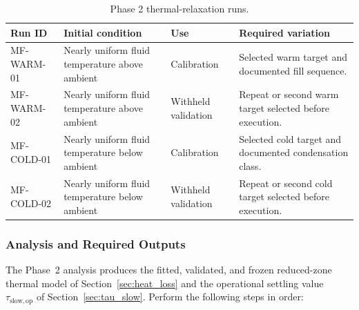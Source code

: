 \documentclass[11pt]{article}
\begin{document}
\begin{table}[htbp]
    \centering
    \caption{Phase 2 thermal-relaxation runs.}
    \label{tab:phase2_relaxation_runs}
    \begin{tabularx}{\textwidth}{
        @{}
        >{\raggedright\arraybackslash}p{1.25in}
        >{\raggedright\arraybackslash}p{1.75in}
        >{\raggedright\arraybackslash}p{1.35in}
        >{\raggedright\arraybackslash}X
        @{}
    }
        \toprule
        \textbf{Run ID} &
        \textbf{Initial condition} &
        \textbf{Use} &
        \textbf{Required variation} \\
        \midrule

        MF-WARM-01 &
        Nearly uniform fluid temperature above ambient &
        Calibration &
        Selected warm target and documented fill sequence. \\

        MF-WARM-02 &
        Nearly uniform fluid temperature above ambient &
        Withheld validation &
        Repeat or second warm target selected before execution. \\

        MF-COLD-01 &
        Nearly uniform fluid temperature below ambient &
        Calibration &
        Selected cold target and documented condensation class. \\

        MF-COLD-02 &
        Nearly uniform fluid temperature below ambient &
        Withheld validation &
        Repeat or second cold target selected before execution. \\

        \bottomrule
    \end{tabularx}
\end{table}

\subsubsection{Analysis and Required Outputs}

The Phase~2 analysis produces the fitted, validated, and frozen reduced-zone thermal model of Section~\ref{sec:heat_loss} and the operational settling value $\tau_{\mathrm{slow,op}}$ of Section~\ref{sec:tau_slow}. Perform the following steps in order:
\end{document}
